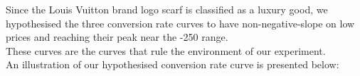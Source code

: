 Since the Louis Vuitton brand logo scarf is classified as a luxury good, we hypothesised the three conversion rate curves to have non-negative-slope on low prices and reaching their peak near the -250 range. \\These curves are the curves that rule the environment of our experiment.\\An illustration of our hypothesised conversion rate curve is presented below:\newline
{} 
\clearpage